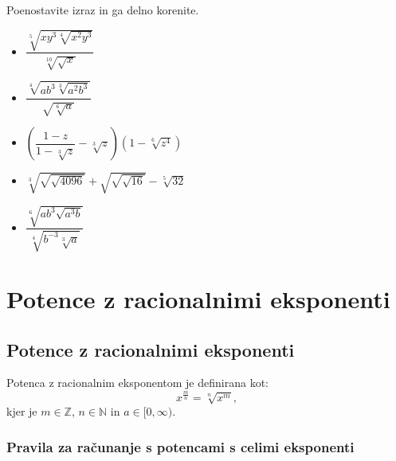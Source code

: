         
            \begin{naloga}
                Poenostavite izraz in ga delno korenite.
                \begin{multicols}{2}
                    \begin{itemize}
                        \item $\displaystyle \dfrac{\sqrt[5]{xy^3\sqrt[4]{x^2y^3}}}{\sqrt[10]{\sqrt{x}}}$ 
                        \item $\displaystyle \dfrac{\sqrt[4]{ab^3\sqrt[3]{a^2b^3}}}{\sqrt{\sqrt[6]{a}}}$ 
                        \item $\displaystyle \left(\dfrac{1-z}{1-\sqrt[3]{z}}-\sqrt[3]{z}\right)\left(1-\sqrt[6]{z^4}\right)$ 
                        \item $\displaystyle \sqrt[3]{\sqrt{\sqrt{4096}}}+\sqrt{\sqrt{\sqrt{16}}}-\sqrt[5]{32}$ 
                        \item $\displaystyle \dfrac{\sqrt[6]{ab^3\sqrt{a^3b}}}{\sqrt[4]{b^{-3}\sqrt[3]{a}}}$ 
                    \end{itemize}
                \end{multicols}
            \end{naloga}
        



            \newpage
    \section{Potence z racionalnimi eksponenti}

        
            \subsection{Potence z racionalnimi eksponenti}

            Potenca z racionalnim eksponentom je definirana kot: 
                $$\displaystyle x^\frac{m}{n}=\sqrt[n]{x^m},$$
                kjer je $m\in\mathbb{Z}$, $n\in\mathbb{N}$ in $a\in[0,\infty)$.
            

            \subsubsection*{Pravila za računanje s potencami s celimi eksponenti}
                
